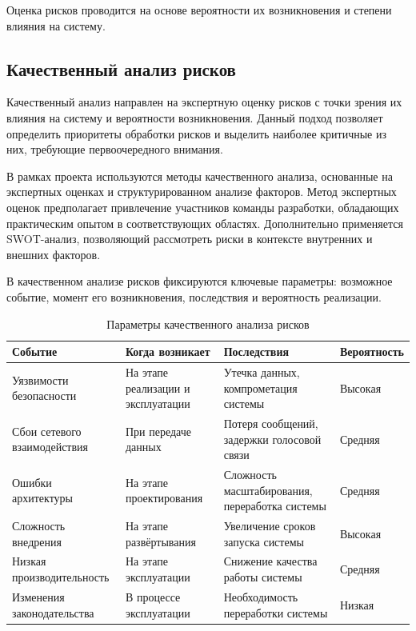 \documentclass[14pt,a4paper]{extarticle}
\begin{document}
Оценка рисков проводится на основе вероятности их возникновения и степени влияния на систему.

\subsection{Качественный анализ рисков}

Качественный анализ направлен на экспертную оценку рисков с точки зрения их влияния на систему и вероятности возникновения. Данный подход позволяет определить приоритеты обработки рисков и выделить наиболее критичные из них, требующие первоочередного внимания.

В рамках проекта используются методы качественного анализа, основанные на экспертных оценках и структурированном анализе факторов. Метод экспертных оценок предполагает привлечение участников команды разработки, обладающих практическим опытом в соответствующих областях. Дополнительно применяется SWOT-анализ, позволяющий рассмотреть риски в контексте внутренних и внешних факторов.

В качественном анализе рисков фиксируются ключевые параметры: возможное событие, момент его возникновения, последствия и вероятность реализации.

\begin{table}[h!]
\centering
\begin{tabular}{|p{4cm}|p{3cm}|p{5cm}|p{2cm}|}
\hline
\textbf{Событие} & \textbf{Когда возникает} & \textbf{Последствия} & \textbf{Вероятность} \\
\hline
Уязвимости безопасности & На этапе реализации и эксплуатации & Утечка данных, компрометация системы & Высокая \\
\hline
Сбои сетевого взаимодействия & При передаче данных & Потеря сообщений, задержки голосовой связи & Средняя \\
\hline
Ошибки архитектуры & На этапе проектирования & Сложность масштабирования, переработка системы & Средняя \\
\hline
Сложность внедрения & На этапе развёртывания & Увеличение сроков запуска системы & Высокая \\
\hline
Низкая производительность & На этапе эксплуатации & Снижение качества работы системы & Средняя \\
\hline
Изменения законодательства & В процессе эксплуатации & Необходимость переработки системы & Низкая \\
\hline
\end{tabular}
\caption{Параметры качественного анализа рисков}
\end{table}
\end{document}
